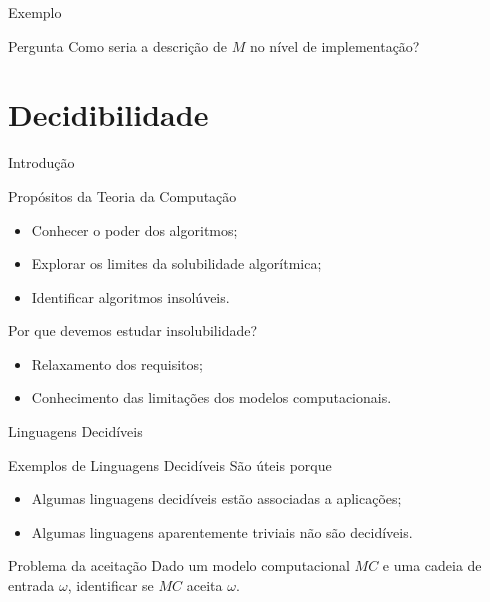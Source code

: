 \documentclass[xcolor=dvipsnames,table]{beamer}
\begin{document}
	\begin{frame}{Exemplo}
		\begin{block}{Pergunta}
			Como seria a descrição de $M$ no nível de implementação?
		\end{block}
	\end{frame}
	
	\section{Decidibilidade}
	\begin{frame}{Introdução}
		\begin{block}{Propósitos da Teoria da Computação}
			\begin{itemize}
				\item Conhecer o poder dos algoritmos;
				\item Explorar os limites da solubilidade algorítmica;
				\item Identificar algoritmos insolúveis.
			\end{itemize}
		\end{block}  \pause
		\begin{block}{Por que devemos estudar insolubilidade?}
			\begin{itemize}
				\item Relaxamento dos requisitos;
				\item Conhecimento das limitações dos modelos computacionais.
			\end{itemize}
		\end{block}
	\end{frame}
	
	\begin{frame}{Linguagens Decidíveis}
		\begin{block}{Exemplos de Linguagens Decidíveis}
			São úteis porque
			\begin{itemize}
				\item Algumas linguagens decidíveis estão associadas a aplicações;
				\item Algumas linguagens aparentemente triviais não são decidíveis.
			\end{itemize}
		\end{block} \pause
		\begin{block}{Problema da aceitação}
			Dado um modelo computacional $MC$ e uma cadeia de entrada $\omega$, identificar se $MC$ aceita $\omega$.
		\end{block}	
	\end{frame}
	
\end{document}
